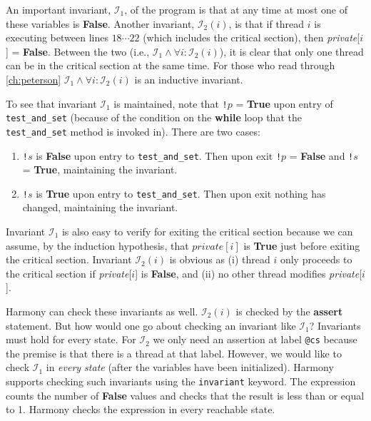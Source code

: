 \documentclass{report}
\begin{document}
An important invariant, $\mathcal{I}_1$, of the program is that at any time at most
one of these variables is \textbf{False}.
Another invariant, $\mathcal{I}_2(i)$, is that if thread $i$ is executing between
lines $18 \cdots 22$ (which includes the critical section),
then \textit{private}[$i$] = \textbf{False}.
Between the two (i.e., $\mathcal{I}_1 \land \forall i: \mathcal{I}_2(i)$),
it is clear that only one thread can be in the
critical section at the same time.
For those who read through \autoref{ch:peterson}
$\mathcal{I}_1 \land \forall i: \mathcal{I}_2(i)$ is an inductive invariant.

To see that invariant $\mathcal{I}_1$ is maintained, note that
\texttt{!}$p$ = \textbf{True} upon entry of \texttt{test\_and\_set}
(because of the condition on the \textbf{while} loop that the
\texttt{test\_and\_set} method is invoked in).
There are two cases:
\begin{enumerate}
\item \texttt{!}$s$ is \textbf{False} upon entry to \texttt{test\_and\_set}.
Then upon exit \texttt{!}$p$ = \textbf{False} and \texttt{!}$s$ = \textbf{True},
maintaining the invariant.
\item \texttt{!}$s$ is \textbf{True} upon entry to \texttt{test\_and\_set}.
Then upon exit nothing has changed, maintaining the invariant.
\end{enumerate}
Invariant $\mathcal{I}_1$ is also easy to verify for exiting the critical section
because we can assume, by the induction hypothesis, that $\textit{private}[i]$ is
\textbf{True} just before exiting the critical section.
Invariant $\mathcal{I}_2(i)$ is obvious as (i) thread $i$ only proceeds to the critical
section if \textit{private}[$i$] is \textbf{False}, and (ii) no other thread modifies
\textit{private}[$i$].

Harmony can check these invariants as well.
$\mathcal{I}_2(i)$ is checked by the \textbf{assert} statement.
But how would one go about checking an
invariant like $\mathcal{I}_1$?  Invariants must hold for every state.
For $\mathcal{I}_2$ we only need an assertion at label \texttt{@cs} because the
premise is that there is a thread at that label.  However, we would
like to check $\mathcal{I}_1$ in \emph{every state} (after the variables have
been initialized).
Harmony supports checking such invariants using the \texttt{invariant}
keyword.
The expression counts the number of \textbf{False} values and checks that
the result is less than or equal to 1.
Harmony checks the expression in every reachable state.
\end{document}
